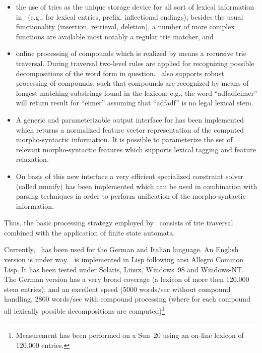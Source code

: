 \begin{itemize}

\item   the use of tries as the unique storage device for all sort of
        lexical information in \mona\
        (e.g., for lexical entries, prefix, inflectional endings);
        besides the usual functionality (insertion, retrieval,
        deletion), a number of more complex functions are available 
        most notably a regular trie matcher, and

\item   online processing of compounds which is realized 
        by means a recursive trie traversal. 
        During traversal two-level rules
        are applied for recognizing possible decompositions
        of the word form in question. \mona\ also supports
        robust processing of compounds, such that
        compounds are recognized by means of longest
        matching substrings found in the lexicon; e.g., 
        the word ``adfadfeimer''
        will return result for ``eimer'' assuming that ``adfadf'' is no legal
        lexical stem.

\item   A generic and parameterizable output interface for \mona
        has been implemented which returns a
        normalized feature vector representation of the computed
        morpho-syntactic information. It is possible to parameterize
        the set of relevant morpho-syntactic features which supports lexical
        tagging and feature relaxation.

\item   On basis of this new interface a  very efficient specialized
        constraint solver (called {\sc munify}) has been implemented 
        which can be used in combination with parsing techniques
        in order to perform unification of the morpho-syntactic
        information.
              

\end{itemize}

Thus, the basic processing strategy employed by \mona\ consists of 
trie traversal combined with the application of finite state automata.

Currently, \mona\ has been used for the German and Italian language.
An English version is under way. \mona\ is implemented in Lisp
following ansi Allegro Common Lisp. It has been tested under Solaris,
Linux, Windows~98 and Windows-NT.
The German version has a very broad coverage (a lexicon of
more then 120.000 stem entries), and an excellent speed (5000 words/sec
without compound handling, 2800 words/sec with compound processing
(where for each compound all lexically possible
decompositions are computed)\footnote{
Measurement has been performed on a Sun~20 using an on-line lexicon of
120.000 entries.}

